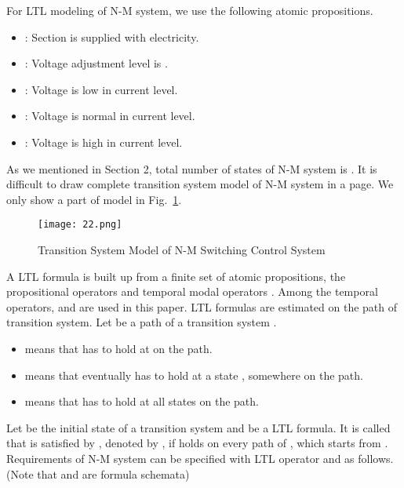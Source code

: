 \documentclass[runningheads,a4paper]{llncs}
\begin{document}
For LTL modeling of N-M system, we use the following atomic propositions. 
\begin{itemize}
\item : Section  is supplied with electricity. 

\item  : Voltage adjustment level is . 

\item  : Voltage is low in current level.

\item : Voltage is normal in current level. 	

\item : Voltage is high in current level.
\end{itemize}

As we mentioned in Section 2, total number of states of N-M system is . It is difficult to draw complete transition system model of N-M system in a page. We only show a part of model in Fig.~\ref{fig2}. 

\begin{figure}
\centering
\texttt{[image: 22.png]}
\caption{Transition System Model of N-M Switching Control System}
\label{fig2}
\end{figure}

A LTL formula  is built up from a finite set of atomic propositions, the propositional operators   and temporal modal operators . Among the temporal operators,  and  are used in this paper. LTL formulas are estimated on the path of transition system. Let  be a path of a transition system . 

\begin{itemize}
\item  means that  has to hold at  on the path.  

\item  means that  eventually has to hold at a state , somewhere on the path. 

\item   means that  has to hold at all states  on the path. 
\end{itemize}

Let  be the initial state of a transition system  and  be a LTL formula. It is called that  is satisfied by , denoted by , if  holds on every path of , which starts from . Requirements of N-M system can be specified with LTL operator  and  as follows. (Note that  and  are formula schemata)\\

             \\
\end{document}
